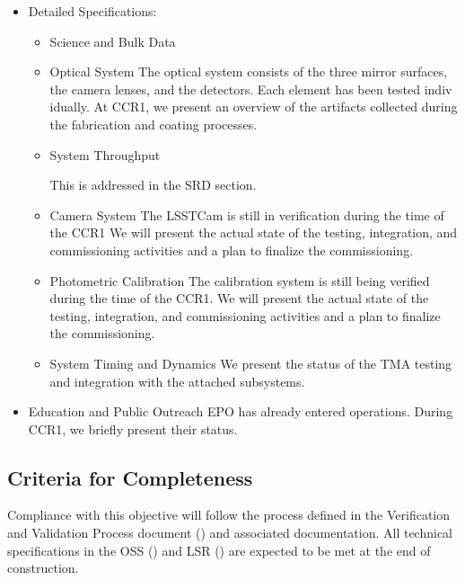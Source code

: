 \begin{itemize}
\begin{itemize}
	\end{itemize}

\item Detailed Specifications:

	\begin{itemize}
		\item Science and Bulk Data
		
		\item Optical System 
		The optical system consists of the three mirror surfaces, the camera lenses, and the detectors. Each element has been tested indiv
		idually. At CCR1, we present an overview of the artifacts collected during the fabrication and coating processes.
		
		\item System Throughput
		
		This is addressed in the SRD section.
		
		\item Camera System
		The LSSTCam is still in verification during the time of the CCR1
		We will present the actual state of the testing, integration, and commissioning activities and a plan to finalize the commissioning.
		
		\item Photometric Calibration
		The calibration system is still being verified during the time of the CCR1.
		We will present the actual state of the testing, integration, and commissioning activities and a plan to finalize the commissioning.
		
		\item System Timing and Dynamics
		We present the status of the TMA testing and integration with the attached subsystems.
		
	\end{itemize}
	
\item Education and Public Outreach
	EPO has already entered operations. During CCR1, we briefly present their status.
	
\end{itemize}

\subsection{Criteria for Completeness}
Compliance with this objective will follow the process defined in the Verification and Validation Process document () and associated documentation.  
All technical specifications in the OSS () and LSR () are expected to be met at the end of construction.

